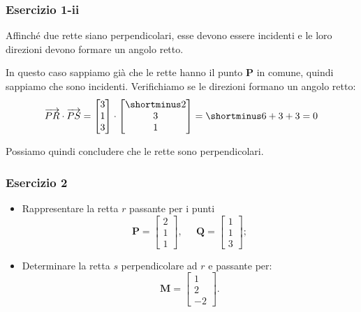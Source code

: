 \documentclass{beamer}
\begin{document}
\begin{frame}
\frametitle{Esercizio 1-ii}
Affinch\'e due rette siano perpendicolari, esse devono essere incidenti e le loro direzioni
devono formare un angolo retto.

    \vspace{0.4cm}
In questo caso sappiamo gi\`a che le rette hanno il punto $\mathbf P$ in comune, quindi sappiamo
che sono incidenti. Verifichiamo se le direzioni formano un angolo retto:
\begin{displaymath}
\overrightarrow{PR} \cdot \overrightarrow{PS}
    =
\begin{bmatrix} 3 \\ 1 \\3 \end{bmatrix}\cdot \begin{bmatrix}\shortminus 2\\ 3 \\1 \end{bmatrix} =
    \shortminus 6 + 3 + 3 = 0
\end{displaymath}

Possiamo quindi concludere che le rette sono perpendicolari.
\end{frame}

    
%
%
\begin{frame}
\frametitle{Esercizio 2}
\begin{itemize}
\item Rappresentare la retta $r$ passante per i punti
\begin{displaymath}
\mathbf{P}=\begin{bmatrix}2\\1\\1 \end{bmatrix},\;\;\;\;\;
\mathbf{Q}=\begin{bmatrix}1\\1\\3 \end{bmatrix};
\end{displaymath}
\item Determinare la retta $s$ perpendicolare ad $r$ e passante per:
\begin{displaymath}
\mathbf{M}=\begin{bmatrix}1\\2\\-2 \end{bmatrix}.
\end{displaymath}
\end{itemize}
\end{frame}
\end{document}
